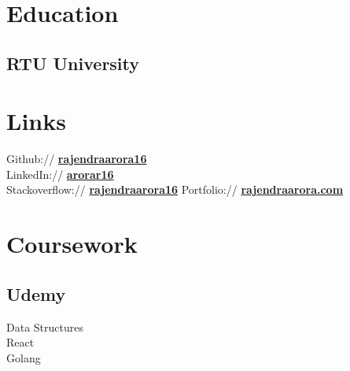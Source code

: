 \documentclass[]{deedy-resume-openfont}
\begin{document}
%
%

%
%

\begin{minipage}[t]{0.33\textwidth} 


\section{Education} 

\subsection{RTU University}
\sectionsep



\section{Links}

Github:// \href{https://github.com/rajendraarora16}{\bf rajendraarora16} \\
LinkedIn://  \href{https://www.linkedin.com/in/arorar16/}{\bf arorar16} \\
Stackoverflow:// \href{https://stackoverflow.com/users/2802622/}{\bf rajendraarora16}
Portfolio:// \href{https://rajendraarora.com/}{\bf rajendraarora.com} \\



\section{Coursework}
\subsection{Udemy}
Data Structures \\
React \\
Golang \\
\sectionsep



\end{minipage}
\end{document}
